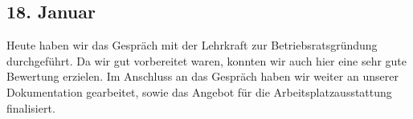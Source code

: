 \subsection{18. Januar}
Heute haben wir das Gespräch mit der Lehrkraft zur Betriebsratsgründung durchgeführt. Da wir gut vorbereitet waren, konnten wir auch hier eine sehr gute Bewertung erzielen. Im Anschluss an das Gespräch haben wir weiter an unserer Dokumentation gearbeitet, sowie das Angebot für die Arbeitsplatzausstattung finalisiert.